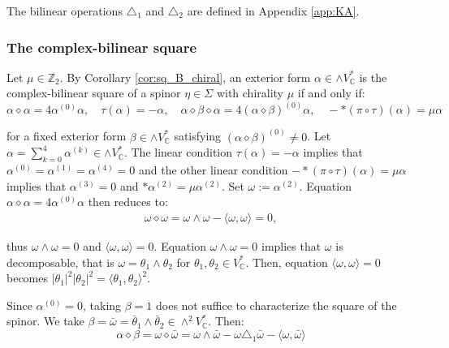 \documentclass[10pt,a4paper,twoside,reqno]{amsart}
\theoremstyle{plain}
\theoremstyle{definition}
\theoremstyle{remark}
\def\C{\mathbb{C}}
\newcommand{\abs}[1]{\left\lvert#1\right\rvert}
\newcommand{\escal}[1]{\langle#1\rangle}
\begin{document}
\noindent
The bilinear operations $\triangle_1$ and $\triangle_2$ are defined in Appendix \ref{app:KA}.


\subsubsection{The complex-bilinear square}


Let $\mu\in\mathbb{Z}_2$. By Corollary \ref{cor:sq_B_chiral}, an exterior form $\alpha\in\wedge V^*_\C$ is the complex-bilinear square of a spinor $\eta\in\Sigma$ with chirality $\mu$ if and only if:
\begin{equation*}
 \alpha\diamond\alpha=4\alpha^{(0)}\alpha,\quad\tau(\alpha)=-\alpha,\quad\alpha\diamond\beta\diamond\alpha=4(\alpha\diamond\beta)^{(0)}\alpha,\quad-*(\pi\circ\tau)(\alpha)=\mu\alpha   
\end{equation*}

\noindent
for a fixed exterior form $\beta\in\wedge V^*_\C$ satisfying $(\alpha\diamond\beta)^{(0)}\neq0$. Let $\alpha=\sum_{k=0}^4\alpha^{(k)}\in\wedge V^*_\C$. The linear condition $\tau(\alpha)=-\alpha$ implies that $\alpha^{(0)} = \alpha^{(1)} = \alpha^{(4)}=0$ and the other linear condition $-*(\pi\circ\tau)(\alpha)=\mu\alpha$ implies that $\alpha^{(3)}=0$ and $*\alpha^{(2)}=\mu\alpha^{(2)}$. Set $\omega:=\alpha^{(2)}$. Equation $\alpha\diamond\alpha=4\alpha^{(0)}\alpha$ then reduces to:
\begin{eqnarray*}
 \omega\diamond\omega=\omega\wedge\omega-\escal{\omega,\omega}=0,
\end{eqnarray*}

\noindent
thus $\omega\wedge\omega=0$ and $\escal{\omega,\omega}=0$. Equation $\omega\wedge\omega=0$ implies that $\omega$ is decomposable, that is $\omega=\theta_1\wedge\theta_2$ for $\theta_1,\theta_2\in V^*_\C$. Then, equation $\escal{\omega,\omega}=0$ becomes $\abs{\theta_1}^2\abs{\theta_2}^2=\escal{\theta_1,\theta_2}^2$.\medskip

\noindent
Since $\alpha^{(0)}=0$, taking $\beta=1$ does not suffice to characterize the square of the spinor. We take $\beta=\bar\omega=\bar\theta_1\wedge\bar\theta_2\in\wedge^2V^*_\C$. Then:
\begin{equation*}
\alpha\diamond\beta=\omega\diamond\bar\omega=\omega\wedge\bar\omega-\omega\triangle_1\bar\omega-\escal{\omega,\bar\omega}
\end{equation*}
\end{document}
